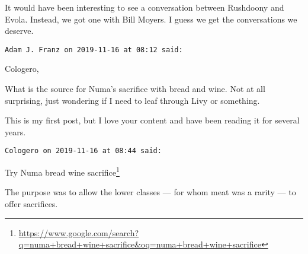 \begin{footnotesize}
\begin{sffamily}
It would have been interesting to see a conversation between Rushdoony and Evola. Instead, we got one with Bill Moyers. I guess we get the conversations we deserve.


\hfill

\texttt{Adam J. Franz on 2019-11-16 at 08:12 said: }

Cologero,

What is the source for Numa's sacrifice with bread and wine. Not at all surprising, just wondering if I need to leaf through Livy or something. 

This is my first post, but I love your content and have been reading it for several years.


\hfill

\texttt{Cologero on 2019-11-16 at 08:44 said: }

Try Numa bread wine sacrifice\footnote{\url{https://www.google.com/search?q=numa+bread+wine+sacrifice&oq=numa+bread+wine+sacrifice}}

The purpose was to allow the lower classes — for whom meat was a rarity — to offer sacrifices.


\end{sffamily}\end{footnotesize}
